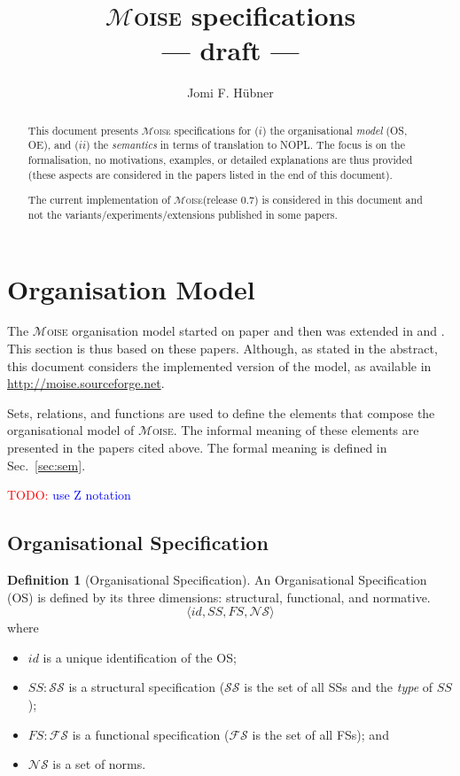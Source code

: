 \documentclass{article}
\newcommand{\moise}{{$\mathcal{M}$\textsc{oise}}\xspace}
\newcommand{\todo}[1]{\textcolor{red}{TODO: }\textcolor{blue}{#1}}
\newcommand{\set}[1]{\mathcal{#1}}
\theoremstyle{definition} \newtheorem{definition}{Definition}
\begin{document}
\title{\moise specifications \\ --- draft ---}
\author{Jomi F. H\"ubner}
\maketitle

\begin{abstract}
  This document presents \moise specifications for ($i$) the
  organisational \emph{model} (OS, OE), and ($ii$) the
  \emph{semantics} in terms of translation to NOPL. The focus is on
  the formalisation, no motivations, examples, or detailed
  explanations are thus provided (these aspects are considered in the
  papers listed in the end of this document).

  The current implementation of \moise (release 0.7) is considered in
  this document and not the variants/experiments/extensions
  published in some papers.
\end{abstract}


\newpage
\tableofcontents
\newpage


\section{Organisation Model}

The \moise organisation model started on paper \cite{hannoun:02} and
then was extended in \cite{hubner:02b} and \cite{gateau:eumas05}. This
section is thus based on these papers. Although, as stated in the
abstract, this document considers the implemented version of the
model, as available in \url{http://moise.sourceforge.net}.

Sets, relations, and functions are used to define the elements that
compose the organisational model of \moise. The informal meaning of
these elements are presented in the papers cited above. The formal
meaning is defined in Sec.~\ref{sec:sem}.

\todo{use Z notation}

\subsection{Organisational Specification}


\begin{definition}[Organisational Specification]
  An Organisational Specification (OS) is defined by its three
  dimensions: structural, functional, and normative.
  \begin{displaymath}
    \langle id, SS, FS, \set{NS} \rangle
  \end{displaymath}
  where
  \begin{itemize}
  \item $id$ is a unique identification of the OS;
  \item $SS : \set{SS}$ is a structural specification ($\set{SS}$ is
    the set of all SSs and the \emph{type} of $SS$);
  \item $FS : \set{FS}$ is a functional specification ($\set{FS}$ is
    the set of all FSs); and
  \item $\set{NS}$ is a set of norms.
  \end{itemize}
\end{definition}
\end{document}
